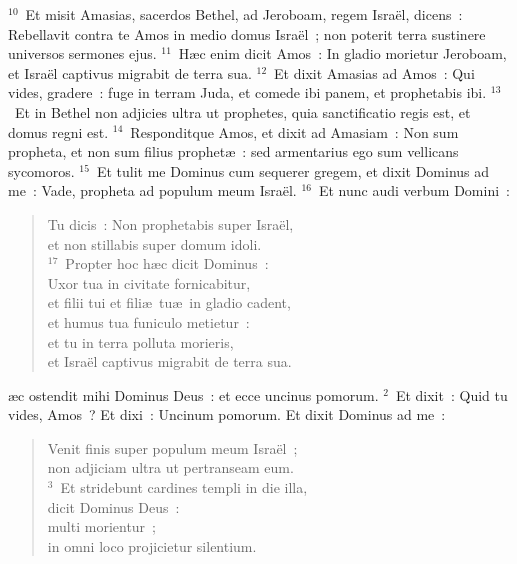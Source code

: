 ${}^{10}$~Et misit Amasias, sacerdos Bethel, ad Jeroboam, regem Isra\"el, dicens~: Rebellavit contra te Amos in medio domus Isra\"el~; non poterit terra sustinere universos sermones ejus.
${}^{11}$~H\ae c enim dicit Amos~: In gladio morietur Jeroboam, et Isra\"el captivus migrabit de terra sua.
${}^{12}$~Et dixit Amasias ad Amos~: Qui vides, gradere~: fuge in terram Juda, et comede ibi panem, et prophetabis ibi.
${}^{13}$~Et in Bethel non adjicies ultra ut prophetes, quia sanctificatio regis est, et domus regni est.
${}^{14}$~Responditque Amos, et dixit ad Amasiam~: Non sum propheta, et non sum filius prophet\ae~: sed armentarius ego sum vellicans sycomoros.
${}^{15}$~Et tulit me Dominus cum sequerer gregem, et dixit Dominus ad me~: Vade, propheta ad populum meum Isra\"el.
${}^{16}$~Et nunc audi verbum Domini~: \begin{verse}Tu dicis~: Non prophetabis super Isra\"el,\\ et non stillabis super domum idoli.\\
${}^{17}$~Propter hoc h\ae c dicit Dominus~:\\ Uxor tua in civitate fornicabitur,\\ et filii tui et fili\ae\ tu\ae\ in gladio cadent,\\ et humus tua funiculo metietur~:\\ et tu in terra polluta morieris,\\ et Isra\"el captivus migrabit de terra sua.\end{verse}



\bchapter
{}\ae c ostendit mihi Dominus Deus~: et ecce uncinus pomorum.
${}^{2}$~Et dixit~: Quid tu vides, Amos~? Et dixi~: Uncinum pomorum. Et dixit Dominus ad me~: \begin{verse}Venit finis super populum meum Isra\"el~;\\ non adjiciam ultra ut pertranseam eum.\\
${}^{3}$~Et stridebunt cardines templi in die illa,\\ dicit Dominus Deus~:\\ multi morientur~;\\ in omni loco projicietur silentium.\end{verse}


